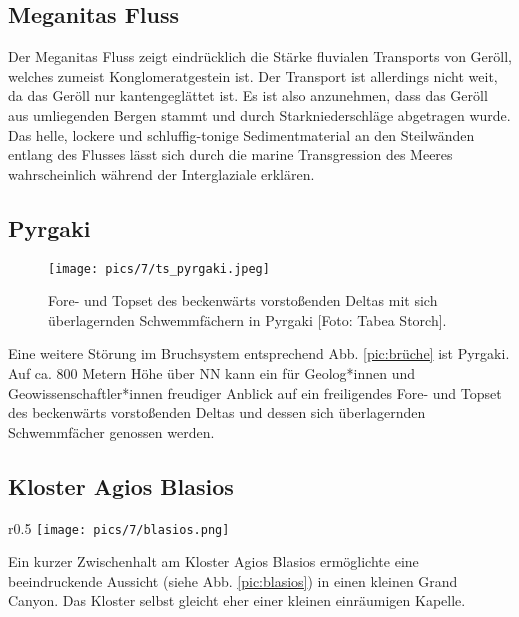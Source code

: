 \documentclass[preprint]{geomorphica} %
\begin{document}
\subsection{Meganitas Fluss}

Der Meganitas Fluss zeigt eindrücklich die Stärke fluvialen Transports von Geröll, welches zumeist Konglomeratgestein ist. Der Transport ist allerdings nicht weit, da das Geröll nur kantengeglättet ist. Es ist also anzunehmen, dass das Geröll aus umliegenden Bergen stammt und durch Starkniederschläge abgetragen wurde. Das helle, lockere und schluffig-tonige Sedimentmaterial an den Steilwänden entlang des Flusses lässt sich durch die marine Transgression des Meeres wahrscheinlich während der Interglaziale erklären.

\subsection{Pyrgaki}

\begin{figure}[h]
    \centering
    \texttt{[image: pics/7/ts\_pyrgaki.jpeg]}
    \caption{Fore- und Topset des beckenwärts vorstoßenden Deltas mit sich überlagernden Schwemmfächern in Pyrgaki [Foto: Tabea Storch].}
    \label{pic:pyrgaki}
\end{figure}

Eine weitere Störung im Bruchsystem entsprechend Abb. \ref{pic:brüche} ist Pyrgaki. Auf ca. 800 Metern Höhe über NN kann ein für Geolog*innen und Geowissenschaftler*innen freudiger Anblick auf ein freiligendes Fore- und Topset des beckenwärts vorstoßenden Deltas und dessen sich überlagernden Schwemmfächer genossen werden.

\subsection{Kloster Agios Blasios}

\begin{wrapfigure}{r}{0.5\textwidth}
    \vspace{-15mm}
    \centering
    \texttt{[image: pics/7/blasios.png]}
    \caption{Aussicht vom Kloster Agios Blasios, rechts der sympathische Erzähler Ingmar.}
    \label{pic:blasios}
\end{wrapfigure}

Ein kurzer Zwischenhalt am Kloster Agios Blasios ermöglichte eine beeindruckende Aussicht (siehe Abb. \ref{pic:blasios}) in einen kleinen Grand Canyon. Das Kloster selbst gleicht eher einer kleinen einräumigen Kapelle.
\end{document}
